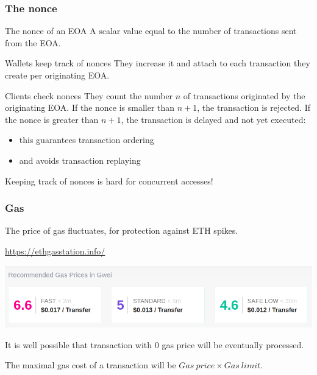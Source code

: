 \documentclass[11pt]{beamer}  %
\begin{document}
\begin{frame}\frametitle{The nonce}

  \begin{greenbox}{The nonce of an EOA}
    A scalar value equal to the number of transactions sent from the EOA.
  \end{greenbox}

  \bigskip

  \begin{greenbox}{Wallets keep track of nonces}
    They increase it and attach to each transaction they create per
    originating EOA.
  \end{greenbox}

  \bigskip

  \begin{greenbox}{Clients check nonces}
    They count the number $n$ of transactions originated
    by the originating EOA. If the nonce is smaller than $n+1$, the
    transaction is rejected. If the nonce is greater than $n+1$,
    the transaction is delayed and not yet executed:
    \begin{itemize}
    \item this guarantees transaction ordering
    \item and avoids transaction replaying
    \end{itemize}
  \end{greenbox}

  \bigskip

  \begin{redbox}{}
    Keeping track of nonces is hard for concurrent accesses!
  \end{redbox}

\end{frame}

\begin{frame}\frametitle{Gas}

  The price of gas fluctuates, for protection against ETH spikes.

  \bigskip

  \begin{greenbox}{\url{https://ethgasstation.info/}}
    \begin{center}
      \includegraphics[width=\textwidth,clip=false]{pictures/ethgasstation.png}
    \end{center}
  \end{greenbox}

  \bigskip

  It is well possible that transaction with $0$ gas price will be eventually
  processed.

  \bigskip

  The maximal gas cost of a transaction will be $\mathit{Gas\ price}\times\mathit{Gas\ limit}$.
\end{frame}
\end{document}
